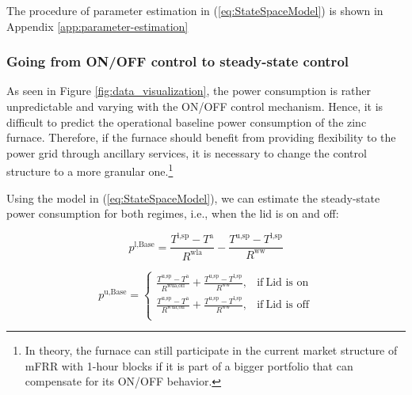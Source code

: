\documentclass[sigconf]{acmart}
\begin{document}
The procedure of parameter estimation in (\ref{eq:StateSpaceModel}) is shown in Appendix \ref{app:parameter-estimation}


\subsubsection{Going from ON/OFF control to steady-state control}

As seen in Figure \ref{fig:data_visualization}, the power consumption is rather unpredictable and varying with the ON/OFF control mechanism. Hence, it is difficult to predict the operational baseline power consumption of the zinc furnace. Therefore, if the furnace should benefit from providing flexibility to the power grid through ancillary services, it is necessary to change the control structure to a more granular one.\footnote{In theory, the furnace can still participate in the current market structure of mFRR with 1-hour blocks if it is part of a bigger portfolio that can compensate for its ON/OFF behavior.}

Using the model in (\ref{eq:StateSpaceModel}), we can estimate the steady-state power consumption for both regimes, i.e., when the lid is on and off:


\begin{equation}\label{eq1:steady-state-power}
    p^{\text{l},\text{Base}} = \frac{T^{\text{l},\text{sp}} - T^{\text{a}}}{R^{\text{wla}}} - \frac{T^{\text{u},\text{sp}}-T^{\text{l},\text{sp}}}{R^{\text{ww}}}
\end{equation}

\begin{equation}\label{eq2:steady-state-power}
    p^{\text{u},\text{Base}}   =
    \begin{cases}
        \frac{T^{\text{u},\text{sp}} - T^{\text{a}}}{R^{\text{wua},\text{off}}}  + \frac{T^{\text{u},\text{sp}}-T^{\text{l},\text{sp}}}{R^{\text{ww}}}, & \text{if} \ \text{Lid is on}  \\
        \frac{T^{\text{u},\text{sp}} - T^{\text{a}}}{R^{\text{wua},\text{on}}} + \frac{T^{\text{u},\text{sp}}-T^{\text{l},\text{sp}}}{R^{\text{ww}}},   & \text{if} \ \text{Lid is off} \\
    \end{cases}
\end{equation}
\end{document}
